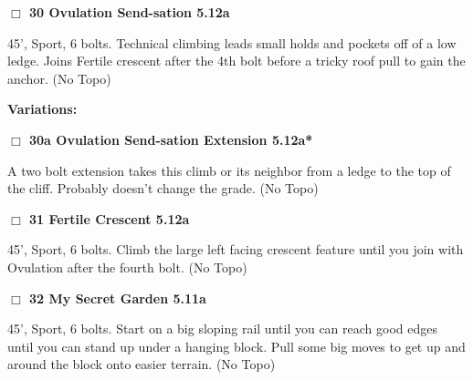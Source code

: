\begin{multicols}{2}
\needspace{1.5cm}
\label{rt:Ovulation Send-sation}
\colorbox{Goldenrod!20}{
\parbox{0.95\linewidth}{
\hspace{-1ex}\textbf{$\Box$
30 Ovulation Send-sation 5.12a  
}}}
\begin{adjustwidth}{1.3em}{}			
45', Sport, 6 bolts. Technical climbing leads small holds and pockets off of a low ledge. Joins Fertile crescent after the 4th bolt before a tricky roof pull to gain the anchor.
  (No Topo)
\end{adjustwidth}


\begin{adjustwidth}{0.5cm}{}				
\needspace{3cm}
\textbf{Variations:} \newline

\needspace{1.5cm}
\label{vr:Ovulation Send-sation Extension}
\colorbox{Goldenrod!20}{
\parbox{0.95\linewidth}{
\hspace{-1ex}\textbf{$\Box$
30a Ovulation Send-sation Extension 5.12a*  
}}}
\begin{adjustwidth}{1.3em}{}			
A two bolt extension takes this climb or its neighbor from a ledge to the top of the cliff. Probably doesn't change the grade.
  (No Topo)
\end{adjustwidth}



\end{adjustwidth}


\needspace{1.5cm}
\label{rt:Fertile Crescent}
\colorbox{Goldenrod!20}{
\parbox{0.95\linewidth}{
\hspace{-1ex}\textbf{$\Box$
31 Fertile Crescent 5.12a  
}}}
\begin{adjustwidth}{1.3em}{}			
45', Sport, 6 bolts. Climb the large left facing crescent feature until you join with Ovulation after the fourth bolt.
  (No Topo)
\end{adjustwidth}




\needspace{1.5cm}
\label{rt:My Secret Garden}
\colorbox{RoyalBlue!20}{
\parbox{0.95\linewidth}{
\hspace{-1ex}\textbf{$\Box$
32 My Secret Garden 5.11a  
}}}
\begin{adjustwidth}{1.3em}{}			
45', Sport, 6 bolts. Start on a big sloping rail until you can reach good edges until you can stand up under a hanging block. Pull some big moves to get up and around the block onto easier terrain.
  (No Topo)
\end{adjustwidth}





\end{multicols}
